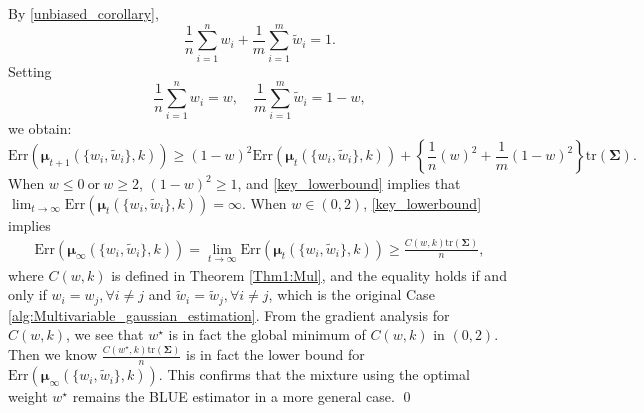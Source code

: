 By \eqref{unbiased_corollary},
\begin{equation*}
\frac{1}{n}\sum_{i=1}^{n}w_i+\frac{1}{m}\sum_{i=1}^{m}\widetilde{w}_i=1.
\end{equation*}
Setting 
\begin{equation*}
\frac{1}{n}\sum_{i=1}^{n}w_i=w, \quad \frac{1}{m}\sum_{i=1}^{m}\widetilde{w}_i=1-w,
\end{equation*}
we obtain:
\begin{equation}
\label{key_lowerbound}
\mathrm{Err}(\bm{\mu}_{t+1}(\{w_i, \widetilde{w}_i\}, k)) \geq \left(1-w \right)^2 \mathrm{Err}(\bm{\mu}_t (\{w_i, \widetilde{w}_i\}, k) ) + \left\{ \frac{1}{n} \left(w \right)^2 + \frac{1}{m} \left(1-w \right)^2 \right\}\mathrm{tr}(\bm{\Sigma}).
\end{equation}
When $w \leq 0 \ \text{or} \  w \geq 2$, $(1-w)^2 \geq 1$, and \eqref{key_lowerbound} implies that $\lim_{t \to \infty} \mathrm{Err}(\bm{\mu}_{t}(\{w_i, \widetilde{w}_i\}, k))=\infty$. When $w \in (0,2)$, \eqref{key_lowerbound} implies 
\begin{align}
\mathrm{Err}(\bm{\mu}_{\infty}(\{w_i, \widetilde{w}_i\}, k)) = \lim_{t \rightarrow \infty} \mathrm{Err}(\bm{\mu}_{t}(\{w_i, \widetilde{w}_i\}, k) ) 
\geq \frac{C(w,k)\mathrm{tr}(\bm{\Sigma})}{n},
\end{align}
where $C(w,k)$ is defined in Theorem \ref{Thm1:Mul}, and the equality holds if and only if $w_i=w_j, \forall i\neq j$ and $\widetilde{w}_i=\widetilde{w}_j, \forall i\neq j$, which is the original Case \ref{alg:Multivariable_gaussian_estimation}.
From the gradient analysis for $C(w,k)$, we see that $w^{\star}$ is in fact the global minimum of $C(w,k)$ in $(0,2)$. Then we know $\frac{C(w^{\star},k)\mathrm{tr}(\bm{\Sigma})}{n}$ is in fact the lower bound for $\mathrm{Err}(\bm{\mu}_{\infty}(\{w_i, \widetilde{w}_i\}, k))$. This confirms that the mixture using the optimal weight $w^{\star}$ remains the BLUE estimator in a more general case. \qed